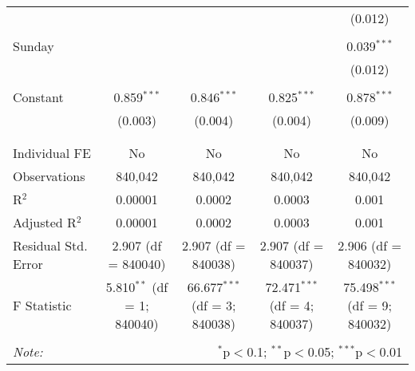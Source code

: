 \documentclass[
]{article}
\begin{document}
\begin{table}[!htbp]
{\begin{tabular}{@{\extracolsep{5pt}}lcccc}
  &  &  &  & (0.012) \\ 
  & & & & \\ 
 Sunday &  &  &  & 0.039$^{***}$ \\ 
  &  &  &  & (0.012) \\ 
  & & & & \\ 
 Constant & 0.859$^{***}$ & 0.846$^{***}$ & 0.825$^{***}$ & 0.878$^{***}$ \\ 
  & (0.003) & (0.004) & (0.004) & (0.009) \\ 
  & & & & \\ 
\hline \\[-1.8ex] 
Individual FE & No & No & No & No \\ 
Observations & 840,042 & 840,042 & 840,042 & 840,042 \\ 
R$^{2}$ & 0.00001 & 0.0002 & 0.0003 & 0.001 \\ 
Adjusted R$^{2}$ & 0.00001 & 0.0002 & 0.0003 & 0.001 \\ 
Residual Std. Error & 2.907 (df = 840040) & 2.907 (df = 840038) & 2.907 (df = 840037) & 2.906 (df = 840032) \\ 
F Statistic & 5.810$^{**}$ (df = 1; 840040) & 66.677$^{***}$ (df = 3; 840038) & 72.471$^{***}$ (df = 4; 840037) & 75.498$^{***}$ (df = 9; 840032) \\ 
\hline 
\hline \\[-1.8ex] 
\textit{Note:}  & \multicolumn{4}{r}{$^{*}$p$<$0.1; $^{**}$p$<$0.05; $^{***}$p$<$0.01} \\ 
\end{tabular}
} 
\end{table} 
\newpage
\end{document}
